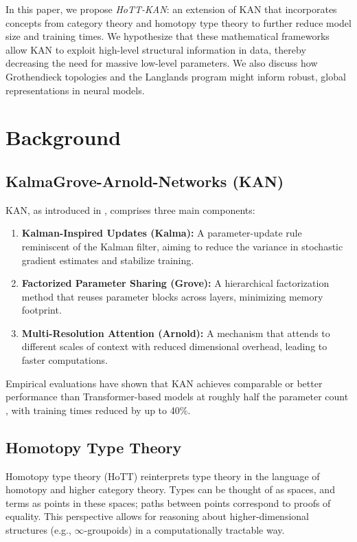 \documentclass{article}
\begin{document}
In this paper, we propose \emph{HoTT-KAN}: an extension of KAN that incorporates concepts from category theory and homotopy type theory to further reduce model size and training times. We hypothesize that these mathematical frameworks allow KAN to exploit high-level structural information in data, thereby decreasing the need for massive low-level parameters. We also discuss how Grothendieck topologies and the Langlands program might inform robust, global representations in neural models.

\section{Background}
\label{sec:background}

\subsection{KalmaGrove-Arnold-Networks (KAN)}
KAN, as introduced in \citet{KAN2024}, comprises three main components:
\begin{enumerate}
    \item \textbf{Kalman-Inspired Updates (Kalma):} A parameter-update rule reminiscent of the Kalman filter, aiming to reduce the variance in stochastic gradient estimates and stabilize training.
    \item \textbf{Factorized Parameter Sharing (Grove):} A hierarchical factorization method that reuses parameter blocks across layers, minimizing memory footprint.
    \item \textbf{Multi-Resolution Attention (Arnold):} A mechanism that attends to different scales of context with reduced dimensional overhead, leading to faster computations.
\end{enumerate}

Empirical evaluations have shown that KAN achieves comparable or better performance than Transformer-based models at roughly half the parameter count \citep{KAN2024}, with training times reduced by up to 40\%.

\subsection{Homotopy Type Theory}
Homotopy type theory (HoTT) \citep{hottbook} reinterprets type theory in the language of homotopy and higher category theory. Types can be thought of as spaces, and terms as points in these spaces; paths between points correspond to proofs of equality. This perspective allows for reasoning about higher-dimensional structures (e.g., \(\infty\)-groupoids) in a computationally tractable way.
\end{document}
